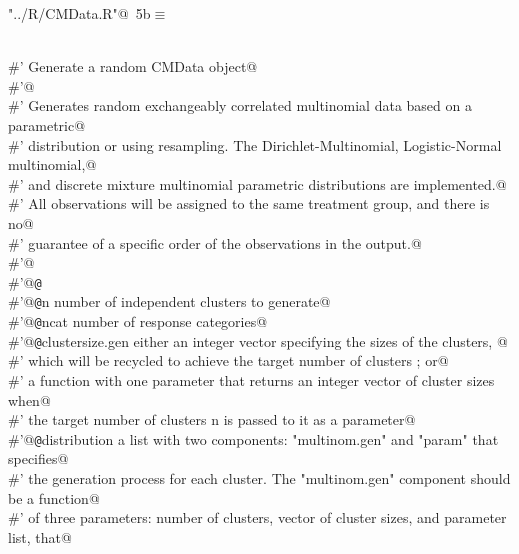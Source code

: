 \documentclass[reqno]{amsart}
\renewcommand{\NWtarget}[2]{\hypertarget{#1}{#2}}
\begin{document}
\begin{flushleft} \small\label{scrap8}\raggedright\small
\NWtarget{nuweb5b}{} \verb@"../R/CMData.R"@\nobreak\ {\footnotesize {5b}}$\equiv$
\vspace{-1ex}
\begin{list}{}{} \item
\mbox{}\verb@@\\
\mbox{}\verb@#' Generate a random CMData object@\\
\mbox{}\verb@#'@\\
\mbox{}\verb@#' Generates random exchangeably correlated multinomial data based on a parametric@\\
\mbox{}\verb@#' distribution or using resampling. The Dirichlet-Multinomial, Logistic-Normal multinomial,@\\
\mbox{}\verb@#' and discrete mixture multinomial parametric distributions are implemented.@\\
\mbox{}\verb@#' All observations will be assigned to the same treatment group, and there is no@\\
\mbox{}\verb@#' guarantee of a specific order of the observations in the output.@\\
\mbox{}\verb@#'@\\
\mbox{}\verb@#'@{\tt @}\verb@export@\\
\mbox{}\verb@#'@{\tt @}\verb@param n number of independent clusters to generate@\\
\mbox{}\verb@#'@{\tt @}\verb@param ncat number of response categories@\\
\mbox{}\verb@#'@{\tt @}\verb@param clustersize.gen either an integer vector specifying the sizes of the clusters, @\\
\mbox{}\verb@#' which will be recycled to achieve the target number of clusters ; or@\\
\mbox{}\verb@#' a function with one parameter that returns an integer vector of cluster sizes when@\\
\mbox{}\verb@#' the target number of clusters n is passed to it as a parameter@\\
\mbox{}\verb@#'@{\tt @}\verb@param distribution a list with two components: "multinom.gen" and "param" that specifies@\\
\mbox{}\verb@#' the generation process for each cluster. The "multinom.gen" component should be a function@\\
\mbox{}\verb@#' of three parameters: number of clusters, vector of cluster sizes, and parameter list, that@\\

\end{list}
\end{flushleft}
\end{document}
